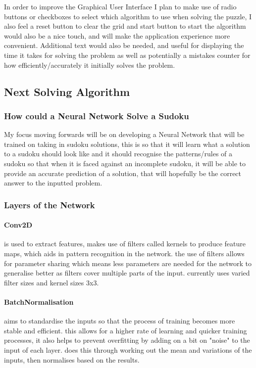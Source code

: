 \documentclass[]{final_report}
\begin{document}
In order to improve the Graphical User Interface I plan to make use of radio buttons or checkboxes to select which algorithm to use when solving the puzzle, I also feel a reset button to clear the grid and start button to start the algorithm would also be a nice touch, and will make the application experience more convenient. Additional text would also be needed, and useful for displaying the time it takes for solving the problem as well as potentially a mistakes counter for how efficiently/accurately it initially solves the problem. 

\subsection*{Next Solving Algorithm} 

\subsubsection{How could a Neural Network Solve a Sudoku} 

My focus moving forwards will be on developing a Neural Network that will be trained on taking in sudoku solutions, this is so that it will learn what a solution to a sudoku should look like and it should recognise the patterns/rules of a sudoku so that when it is faced against an incomplete sudoku, it will be able to provide an accurate prediction of a solution, that will hopefully be the correct answer to the inputted problem.

\subsubsection{Layers of the Network}

\paragraph{Conv2D} 
is used to extract features, makes use of filters called kernels to produce feature maps, which aids in pattern recognition in the network. the use of filters allows for parameter sharing which means less parameters are needed for the network to generalise better as filters cover multiple parts of the input. currently uses varied filter sizes and kernel sizes 3x3.

\paragraph{BatchNormalisation}
aims to standardise the inputs so that the process of training becomes more stable and efficient. this allows for a higher rate of learning and quicker training processes, it also helps to prevent overfitting by adding on a bit on "noise" to the input of each layer. does this through working out the mean and variations of the inputs, then normalises based on the results.
\end{document}
